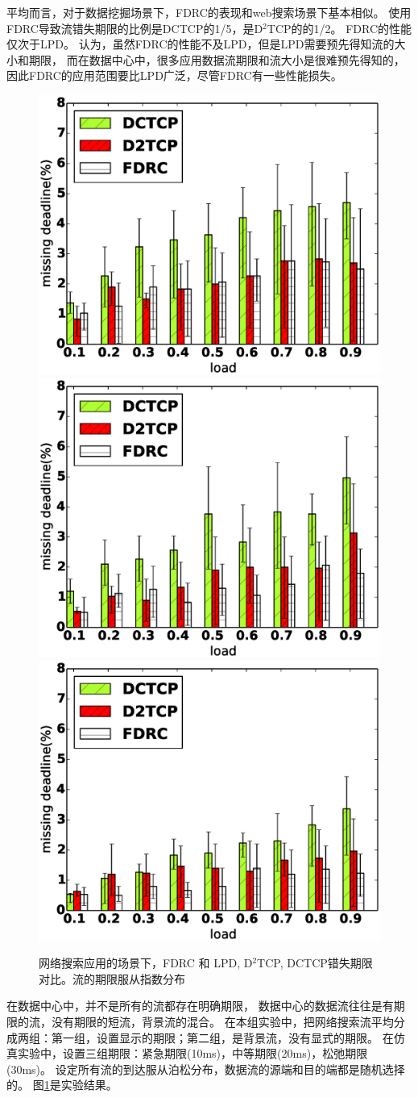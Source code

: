 平均而言，对于数据挖掘场景下，FDRC的表现和web搜索场景下基本相似。
使用FDRC导致流错失期限的比例是DCTCP的1/5，是D$^2$TCP的的1/2。
FDRC的性能仅次于LPD。
认为，虽然FDRC的性能不及LPD，但是LPD需要预先得知流的大小和期限，
而在数据中心中，很多应用数据流期限和流大小是很难预先得知的，
因此FDRC的应用范围要比LPD广泛，尽管FDRC有一些性能损失。

\begin{figure}[h]
\centering
{}
 {\includegraphics[width=0.32\columnwidth]{figures/FDRC/evaluation/spineleaf/miss_deadline_tcp_tight.eps}}
{\includegraphics[width=0.32\columnwidth]{figures/FDRC/evaluation/spineleaf/miss_deadline_tcp_mild.eps}}
{\includegraphics[width=0.32\columnwidth]{figures/FDRC/evaluation/spineleaf/miss_deadline_tcp_lax.eps}}
\caption{网络搜索应用的场景下，FDRC 和 LPD, D$^2$TCP, DCTCP错失期限对比。流的期限服从指数分布}
\label{fdrc-miss-spine-data-fig}
\end{figure}

在数据中心中，并不是所有的流都存在明确期限，
数据中心的数据流往往是有期限的流，没有期限的短流，背景流的混合。
在本组实验中，把网络搜索流平均分成两组：第一组，设置显示的期限；第二组，是背景流，没有显式的期限。
在仿真实验中，设置三组期限：紧急期限(10ms)，中等期限(20ms)，松弛期限(30ms)。
设定所有流的到达服从泊松分布，数据流的源端和目的端都是随机选择的。
图\ref{fdrc-miss-spine-data-fig}是实验结果。

